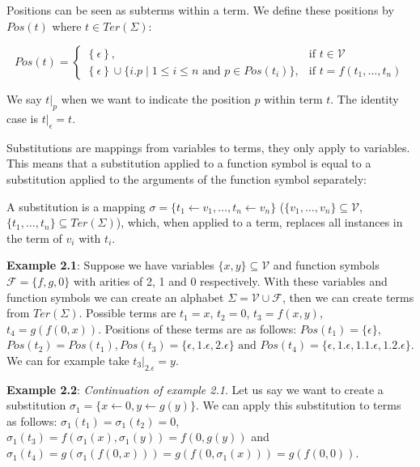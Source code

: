 Positions can be seen as subterms within a term. We define these positions by $\textit{Pos}\left(t\right)$ where $t \in \textit{Ter}\left(\Sigma\right)$:
\begin{definition}
$$
\textit{Pos}(t) = \left\{\begin{array}{ll}
        \left\{\epsilon\right\}, & \text{if } t \in \mathcal{V}\\
        \left\{\epsilon\right\} \cup \{i.p \mid 1 \leq i \leq n \text{ and } p  \in \textit{Pos}(t_i)\} , & \text{if } t = f(t_1, \dots, t_n)
        \end{array}\right.
$$
\end{definition}
We say $\left.t\right|_p$ when we want to indicate the position $p$ within term $t$. The identity case is $\left.t\right|_\epsilon = t$.

Substitutions are mappings from variables to terms, they only apply to variables. This means that a substitution applied to a function symbol is equal to a substitution applied to the arguments of the function symbol separately:
\begin{definition}
A substitution is a mapping $\sigma = \{ t_1 \leftarrow v_1, \dots, t_n \leftarrow v_n \}$ ($\{ v_1, \dots, v_n \} \subseteq \mathcal{V}$, $\{ t_1, \dots, t_n\} \subseteq \textit{Ter}(\Sigma)$), which, when applied to a term, replaces all instances in the term of $v_i$ with $t_i$.
\end{definition}

\textbf{Example 2.1}: Suppose we have variables $\{ x, y \} \subseteq \mathcal{V}$ and function symbols $\mathcal{F} = \{ f, g, 0\}$ with arities of 2, 1 and 0 respectively. With these variables and function symbols we can create an alphabet $\Sigma = \mathcal{V} \cup \mathcal{F}$, then we can create terms from $\textit{Ter}(\Sigma)$. Possible terms are $t_1 = x$, $t_2 = 0$, $t_3 = f(x, y)$, $t_4 = g(f(0, x))$. Positions of these terms are as follows: $\textit{Pos}(t_1) = \{ \epsilon \}$, $\textit{Pos}(t_2) = \textit{Pos}(t_1), \textit{Pos}(t_3) = \{ \epsilon, 1.\epsilon, 2.\epsilon \} \text{ and }\textit{Pos}(t_4) = \{ \epsilon, 1.\epsilon, 1.1.\epsilon, 1.2.\epsilon \}$. We can for example take $\left. t_3\right|_{2.\epsilon} = y$.

\textbf{Example 2.2}: \textit{Continuation of example 2.1}. Let us say we want to create a substitution $\sigma_1 = \{ x \leftarrow 0, y \leftarrow g(y) \}$. We can apply this substitution to terms as follows: $\sigma_1(t_1) = \sigma_1(t_2) = 0$, $\sigma_1(t_3) = f(\sigma_1(x), \sigma_1(y)) = f(0, g(y))$ and $\sigma_1(t_4) = g(\sigma_1(f(0, x))) = g(f(0, \sigma_1(x))) = g(f(0, 0))$.

